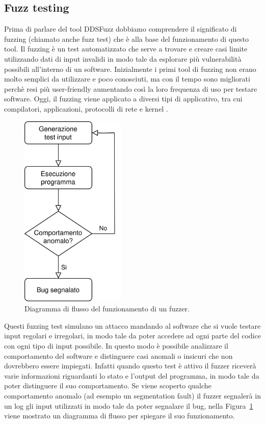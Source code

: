 \subsection{Fuzz testing}
Prima di parlare del tool DDSFuzz dobbiamo comprendere 
il significato di fuzzing (chiamato anche fuzz test) che è
alla base del funzionamento di questo tool. Il fuzzing è un test
automatizzato che serve a trovare e creare casi limite utilizzando
dati di input invalidi in modo tale da esplorare più vulnerabilità
possibili all'interno di un software. 
Inizialmente i primi tool di fuzzing non erano molto 
semplici da utilizzare e poco conosciuti, 
ma con il tempo
sono migliorati perchè resi più user-friendly aumentando così la 
loro frequenza di uso per testare software. Oggi, il fuzzing viene
applicato a diversi tipi di applicativo, tra cui compilatori, 
applicazioni, protocolli di rete e kernel \cite{8371326}.

\begin{figure}[H]
    \centering
    \includegraphics[width=5cm, keepaspectratio]{img/Diagramma di flusso fuzzer.jpg}
    \caption{Diagramma di flusso del funzionamento di un fuzzer.}
    \label{funzionamento fuzzer}
\end{figure}

Questi fuzzing test simulano un attacco mandando al software
che si vuole testare input regolari e irregolari, 
in modo tale da poter 
accedere ad ogni parte del codice con ogni tipo di input possibile.
In questo modo è possibile analizzare il comportamento del software
e distinguere casi anomali o insicuri che non dovrebbero
essere impiegati. Infatti quando questo test è attivo il fuzzer riceverà
varie informazioni riguardanti lo stato e l'output del programma, in 
modo tale da poter distinguere il suo comportamento. Se viene scoperto
qualche comportamento anomalo (ad esempio un segmentation fault) il 
fuzzer segnalerà in un log gli input utilizzati in modo tale da poter 
segnalare il bug, nella Figura~\ref{funzionamento fuzzer} viene mostrato 
un diagramma di flusso per spiegare il suo funzionamento.

